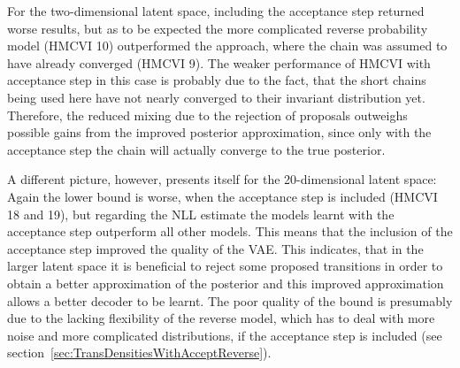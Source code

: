 For the two-dimensional latent space, including the acceptance step returned worse results, but as to be expected the more complicated reverse probability model (HMCVI 10) outperformed the approach, where the chain was assumed to have already converged (HMCVI 9). The weaker performance of HMCVI with acceptance step in this case is probably due to the fact, that the short chains being used here have not nearly converged to their invariant distribution yet. Therefore, the reduced mixing due to the rejection of proposals outweighs possible gains from the improved posterior approximation, since only with the acceptance step the chain will actually converge to the true posterior. 

A different picture, however, presents itself for the 20-dimensional latent space: Again the lower bound is worse, when the acceptance step is included (HMCVI 18 and 19), but regarding the NLL estimate the models learnt with the acceptance step outperform all other models. This means that the inclusion of the acceptance step improved the quality of the VAE. This indicates, that in the larger latent space it is beneficial to reject some proposed transitions in order to obtain a better approximation of the posterior and this improved approximation allows a better decoder to be learnt. The poor quality of the bound is presumably due to the lacking flexibility of the reverse model, which has to deal with more noise and more complicated distributions, if the acceptance step is included (see section~\ref{sec:TransDensitiesWithAcceptReverse}).